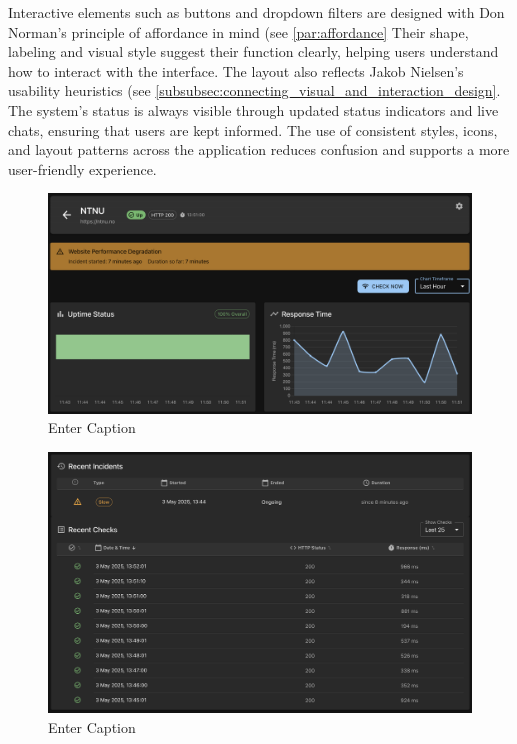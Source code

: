 Interactive elements such as buttons and dropdown filters are designed with Don Norman's principle of affordance in mind (see \ref{par:affordance} Their shape, labeling and visual style suggest their function clearly, helping users understand how to interact with the interface. The layout also reflects Jakob Nielsen's usability heuristics (see \ref{subsubsec:connecting_visual_and_interaction_design}. The system's status is always visible through updated status indicators and live chats, ensuring that users are kept informed. The use of consistent styles, icons, and layout patterns across the application reduces confusion and supports a more user-friendly experience. 


\begin{figure}[H]
    \centering
    \includegraphics[width=1\linewidth]{figures/websiteDetails.png}
    \caption{Enter Caption}
    \label{fig:enter-label}
\end{figure}


\begin{figure}[H]
    \centering
    \includegraphics[width=1\linewidth]{figures/websiteDetails_bottom.png}
    \caption{Enter Caption}
    \label{fig:enter-label}
\end{figure}


